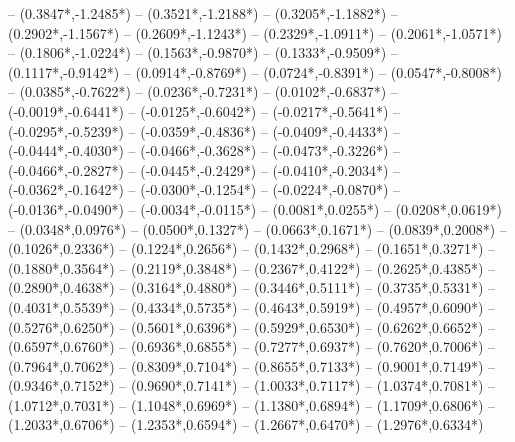 {	-- ({0.3847*\dx},{-1.2485*\dy})
	-- ({0.3521*\dx},{-1.2188*\dy})
	-- ({0.3205*\dx},{-1.1882*\dy})
	-- ({0.2902*\dx},{-1.1567*\dy})
	-- ({0.2609*\dx},{-1.1243*\dy})
	-- ({0.2329*\dx},{-1.0911*\dy})
	-- ({0.2061*\dx},{-1.0571*\dy})
	-- ({0.1806*\dx},{-1.0224*\dy})
	-- ({0.1563*\dx},{-0.9870*\dy})
	-- ({0.1333*\dx},{-0.9509*\dy})
	-- ({0.1117*\dx},{-0.9142*\dy})
	-- ({0.0914*\dx},{-0.8769*\dy})
	-- ({0.0724*\dx},{-0.8391*\dy})
	-- ({0.0547*\dx},{-0.8008*\dy})
	-- ({0.0385*\dx},{-0.7622*\dy})
	-- ({0.0236*\dx},{-0.7231*\dy})
	-- ({0.0102*\dx},{-0.6837*\dy})
	-- ({-0.0019*\dx},{-0.6441*\dy})
	-- ({-0.0125*\dx},{-0.6042*\dy})
	-- ({-0.0217*\dx},{-0.5641*\dy})
	-- ({-0.0295*\dx},{-0.5239*\dy})
	-- ({-0.0359*\dx},{-0.4836*\dy})
	-- ({-0.0409*\dx},{-0.4433*\dy})
	-- ({-0.0444*\dx},{-0.4030*\dy})
	-- ({-0.0466*\dx},{-0.3628*\dy})
	-- ({-0.0473*\dx},{-0.3226*\dy})
	-- ({-0.0466*\dx},{-0.2827*\dy})
	-- ({-0.0445*\dx},{-0.2429*\dy})
	-- ({-0.0410*\dx},{-0.2034*\dy})
	-- ({-0.0362*\dx},{-0.1642*\dy})
	-- ({-0.0300*\dx},{-0.1254*\dy})
	-- ({-0.0224*\dx},{-0.0870*\dy})
	-- ({-0.0136*\dx},{-0.0490*\dy})
	-- ({-0.0034*\dx},{-0.0115*\dy})
	-- ({0.0081*\dx},{0.0255*\dy})
	-- ({0.0208*\dx},{0.0619*\dy})
	-- ({0.0348*\dx},{0.0976*\dy})
	-- ({0.0500*\dx},{0.1327*\dy})
	-- ({0.0663*\dx},{0.1671*\dy})
	-- ({0.0839*\dx},{0.2008*\dy})
	-- ({0.1026*\dx},{0.2336*\dy})
	-- ({0.1224*\dx},{0.2656*\dy})
	-- ({0.1432*\dx},{0.2968*\dy})
	-- ({0.1651*\dx},{0.3271*\dy})
	-- ({0.1880*\dx},{0.3564*\dy})
	-- ({0.2119*\dx},{0.3848*\dy})
	-- ({0.2367*\dx},{0.4122*\dy})
	-- ({0.2625*\dx},{0.4385*\dy})
	-- ({0.2890*\dx},{0.4638*\dy})
	-- ({0.3164*\dx},{0.4880*\dy})
	-- ({0.3446*\dx},{0.5111*\dy})
	-- ({0.3735*\dx},{0.5331*\dy})
	-- ({0.4031*\dx},{0.5539*\dy})
	-- ({0.4334*\dx},{0.5735*\dy})
	-- ({0.4643*\dx},{0.5919*\dy})
	-- ({0.4957*\dx},{0.6090*\dy})
	-- ({0.5276*\dx},{0.6250*\dy})
	-- ({0.5601*\dx},{0.6396*\dy})
	-- ({0.5929*\dx},{0.6530*\dy})
	-- ({0.6262*\dx},{0.6652*\dy})
	-- ({0.6597*\dx},{0.6760*\dy})
	-- ({0.6936*\dx},{0.6855*\dy})
	-- ({0.7277*\dx},{0.6937*\dy})
	-- ({0.7620*\dx},{0.7006*\dy})
	-- ({0.7964*\dx},{0.7062*\dy})
	-- ({0.8309*\dx},{0.7104*\dy})
	-- ({0.8655*\dx},{0.7133*\dy})
	-- ({0.9001*\dx},{0.7149*\dy})
	-- ({0.9346*\dx},{0.7152*\dy})
	-- ({0.9690*\dx},{0.7141*\dy})
	-- ({1.0033*\dx},{0.7117*\dy})
	-- ({1.0374*\dx},{0.7081*\dy})
	-- ({1.0712*\dx},{0.7031*\dy})
	-- ({1.1048*\dx},{0.6969*\dy})
	-- ({1.1380*\dx},{0.6894*\dy})
	-- ({1.1709*\dx},{0.6806*\dy})
	-- ({1.2033*\dx},{0.6706*\dy})
	-- ({1.2353*\dx},{0.6594*\dy})
	-- ({1.2667*\dx},{0.6470*\dy})
	-- ({1.2976*\dx},{0.6334*\dy})
}
